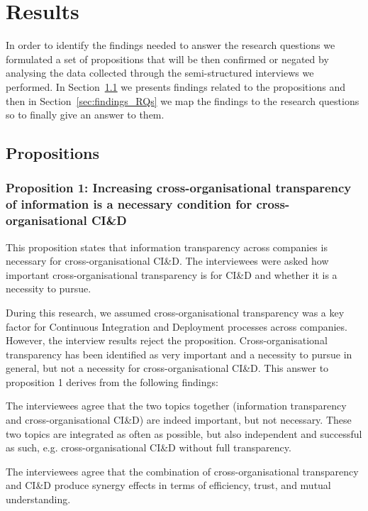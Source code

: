 \section{Results}\label{sec:results}

In order to identify the findings needed to answer the research questions we formulated a set of propositions that will be then confirmed or negated by analysing the data collected through the semi-structured interviews we performed. In Section~\ref{sec:propositions} we presents findings related to the propositions and then in Section~\ref{sec:findings_RQs} we map the findings to the research questions so to finally give an answer to them.

\subsection{Propositions}\label{sec:propositions}

\subsubsection{Proposition 1: Increasing cross-organisational transparency of information is a necessary condition for cross-organisatio\-nal CI\&D}

This proposition states that information transparency across companies is necessary for cross-organisational CI\&D. The interviewees were asked how important cross-orga\-ni\-sa\-tional transparency is for CI\&D and whether it is a necessity to pursue. 

During this research, we assumed cross-organisational transparency was a key factor for Continuous Integration and Deployment processes across companies. However, the interview results reject the proposition. Cross-organisational transparency has been identified as very important and a necessity to pursue in general, but not a necessity for cross-organisational CI\&D. This answer to proposition 1 derives from the following findings:

 The interviewees agree that the two topics together (information transparency and cross-organisational CI\&D) are indeed important, but not necessary. These two topics are integrated as often as possible, but also independent and successful as such, e.g. cross-organisational CI\&D without full transparency.

 The interviewees agree that the combination of cross-organisational transparency and CI\&D produce synergy effects in terms of efficiency, trust, and mutual understanding.

